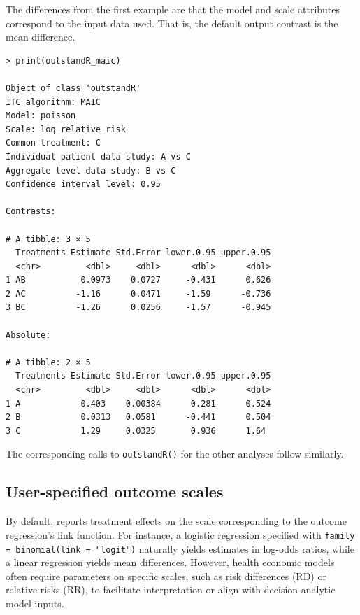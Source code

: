 \documentclass[article]{jss}
\begin{document}
The differences from the first example are that the model and scale attributes correspond to the input data used. That is, the default output contrast is the mean difference.

\begin{verbatim}
> print(outstandR_maic)

Object of class 'outstandR' 
ITC algorithm: MAIC 
Model: poisson 
Scale: log_relative_risk 
Common treatment: C 
Individual patient data study: A vs C 
Aggregate level data study: B vs C 
Confidence interval level: 0.95 

Contrasts:

# A tibble: 3 × 5
  Treatments Estimate Std.Error lower.0.95 upper.0.95
  <chr>         <dbl>     <dbl>      <dbl>      <dbl>
1 AB           0.0973    0.0727     -0.431      0.626
2 AC          -1.16      0.0471     -1.59      -0.736
3 BC          -1.26      0.0256     -1.57      -0.945

Absolute:

# A tibble: 2 × 5
  Treatments Estimate Std.Error lower.0.95 upper.0.95
  <chr>         <dbl>     <dbl>      <dbl>      <dbl>
1 A            0.403    0.00384      0.281      0.524
2 B            0.0313   0.0581      -0.441      0.504
3 C            1.29     0.0325       0.936      1.64 
\end{verbatim}
The corresponding calls to \texttt{outstandR()} for the other analyses follow similarly.

\subsection{User-specified outcome scales}
By default,  reports treatment effects on the scale corresponding to the outcome regression's link function. For instance, a logistic regression specified with \texttt{family = binomial(link = "logit")} naturally yields estimates in log-odds ratios, while a linear regression yields mean differences. However, health economic models often require parameters on specific scales, such as risk differences (RD) or relative risks (RR), to facilitate interpretation or align with decision-analytic model inputs.
\end{document}
